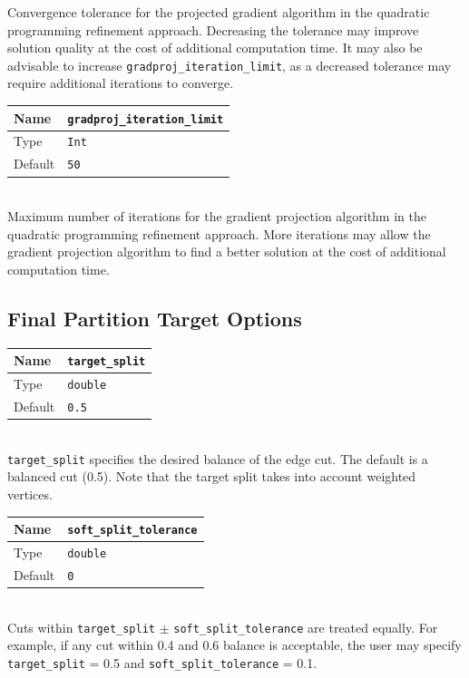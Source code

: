 \documentclass[letter]{article}
\begin{document}
Convergence tolerance for the projected gradient algorithm in the quadratic programming refinement approach.  Decreasing the tolerance may improve solution quality at the cost of additional computation time. It may also be advisable to increase \texttt{gradproj\_iteration\_limit}, as a decreased tolerance may require additional iterations to converge.\\
\baselineskip
\begin{tabular}{|l|l|} \hline
Name & \texttt{gradproj\_iteration\_limit} \\ \hline
Type & \texttt{Int} \\ \hline
Default & \texttt{50} \\ \hline
\end{tabular}\\

Maximum number of iterations for the gradient projection algorithm in the quadratic programming refinement approach. More iterations may allow the gradient projection algorithm to find a better solution at the cost of additional computation time.

\subsection{Final Partition Target Options}

\begin{tabular}{|l|l|} \hline
Name & \texttt{target\_split} \\ \hline
Type & \texttt{double} \\ \hline
Default & \texttt{0.5} \\ \hline
\end{tabular}\\

\texttt{target\_split} specifies the desired balance of the edge cut. The default is a balanced cut (0.5). Note that the target split takes into account weighted vertices.\\
\baselineskip
\begin{tabular}{|l|l|} \hline
Name & \texttt{soft\_split\_tolerance} \\ \hline
Type & \texttt{double} \\ \hline
Default & \texttt{0} \\ \hline
\end{tabular}\\

Cuts within \texttt{target\_split} $\pm$ \texttt{soft\_split\_tolerance} are treated equally. For example, if any cut within 0.4 and 0.6 balance is acceptable, the user may specify \texttt{target\_split} = 0.5 and \texttt{soft\_split\_tolerance} = 0.1.\\
\end{document}
